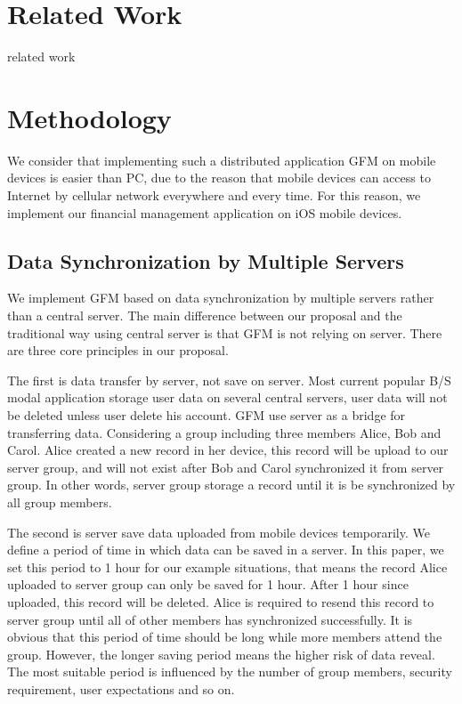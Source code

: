 \documentclass[twocolumn,10pt]{article}
\begin{document}
\section{Related Work}

related work

\section{Methodology}

We consider that implementing such a distributed application GFM on mobile devices is easier than PC, due to the reason that mobile devices can access to Internet by cellular network everywhere and every time. For this reason, we implement our financial management application on iOS mobile devices. 

\subsection{Data Synchronization by Multiple Servers}

We implement GFM based on data synchronization by multiple servers rather than a central server. The main difference between our proposal and the traditional way using central server is that GFM is not relying on server. There are three core principles in our proposal. 

The first is data transfer by server, not save on server. Most current popular B/S modal application storage user data on several central servers, user data will not be deleted unless user delete his account. GFM use server as a bridge for transferring data. Considering a group including three members Alice, Bob and Carol. Alice created a new record in her device, this record will be upload to our server group, and will not exist after Bob and Carol synchronized it from server group. In other words, server group  storage a record until it is be synchronized by all group members.

The second is server save data uploaded from mobile devices temporarily. We define a period of time in which data can be saved in a server. In this paper, we set this period to 1 hour for our example situations, that means the record Alice uploaded to server group can only be saved for 1 hour. After 1 hour since uploaded, this record will be deleted. Alice is required to resend this record to server group until all of other members has synchronized successfully. It is obvious that this period of time should be long while more members attend the group. However, the longer saving period means the higher risk of data reveal. The most suitable period is influenced by the number of group members, security requirement, user expectations and so on. 
\end{document}
